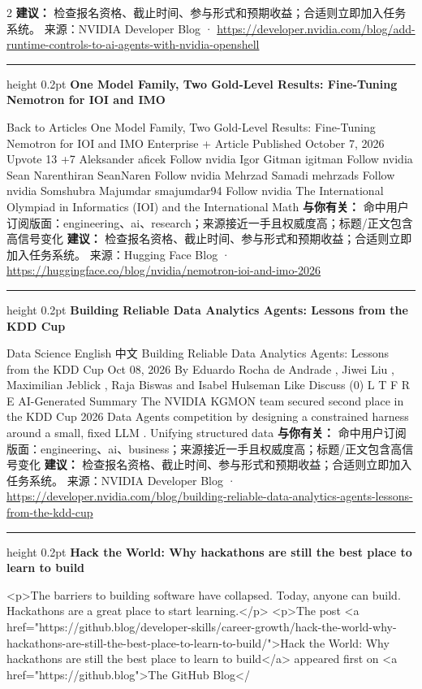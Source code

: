 \documentclass[10.5pt]{ctexart}
\begin{document}
\begin{multicols}{2}
\textbf{建议：} 检查报名资格、截止时间、参与形式和预期收益；合适则立即加入任务系统。
{\footnotesize\color{ormuted} 来源：NVIDIA Developer Blog · \url{https://developer.nvidia.com/blog/add-runtime-controls-to-ai-agents-with-nvidia-openshell}}
\vspace{2mm}
\hrule height 0.2pt
\vspace{2mm}
{\large\bfseries One Model Family, Two Gold-Level Results: Fine-Tuning Nemotron for IOI and IMO}\par
Back to Articles One Model Family, Two Gold-Level Results: Fine-Tuning Nemotron for IOI and IMO Enterprise + Article Published October 7, 2026 Upvote 13 +7 Aleksander aficek Follow nvidia Igor Gitman igitman Follow nvidia Sean Narenthiran SeanNaren Follow nvidia Mehrzad Samadi mehrzads Follow nvidia Somshubra Majumdar smajumdar94 Follow nvidia The International Olympiad in Informatics (IOI) and the International Math
\textbf{与你有关：} 命中用户订阅版面：engineering、ai、research；来源接近一手且权威度高；标题/正文包含高信号变化
\textbf{建议：} 检查报名资格、截止时间、参与形式和预期收益；合适则立即加入任务系统。
{\footnotesize\color{ormuted} 来源：Hugging Face Blog · \url{https://huggingface.co/blog/nvidia/nemotron-ioi-and-imo-2026}}
\vspace{2mm}
\hrule height 0.2pt
\vspace{2mm}
{\large\bfseries Building Reliable Data Analytics Agents: Lessons from the KDD Cup}\par
Data Science English 中文 Building Reliable Data Analytics Agents: Lessons from the KDD Cup Oct 08, 2026 By Eduardo Rocha de Andrade , Jiwei Liu , Maximilian Jeblick , Raja Biswas and Isabel Hulseman Like Discuss (0) L T F R E AI-Generated Summary The NVIDIA KGMON team secured second place in the KDD Cup 2026 Data Agents competition by designing a constrained harness around a small, fixed LLM . Unifying structured data
\textbf{与你有关：} 命中用户订阅版面：engineering、ai、business；来源接近一手且权威度高；标题/正文包含高信号变化
\textbf{建议：} 检查报名资格、截止时间、参与形式和预期收益；合适则立即加入任务系统。
{\footnotesize\color{ormuted} 来源：NVIDIA Developer Blog · \url{https://developer.nvidia.com/blog/building-reliable-data-analytics-agents-lessons-from-the-kdd-cup}}
\vspace{2mm}
\hrule height 0.2pt
\vspace{2mm}
{\large\bfseries Hack the World: Why hackathons are still the best place to learn to build}\par
<p>The barriers to building software have collapsed. Today, anyone can build. Hackathons are a great place to start learning.</p> <p>The post <a href="https://github.blog/developer-skills/career-growth/hack-the-world-why-hackathons-are-still-the-best-place-to-learn-to-build/">Hack the World: Why hackathons are still the best place to learn to build</a> appeared first on <a href="https://github.blog">The GitHub Blog</

\end{multicols}
\end{document}
